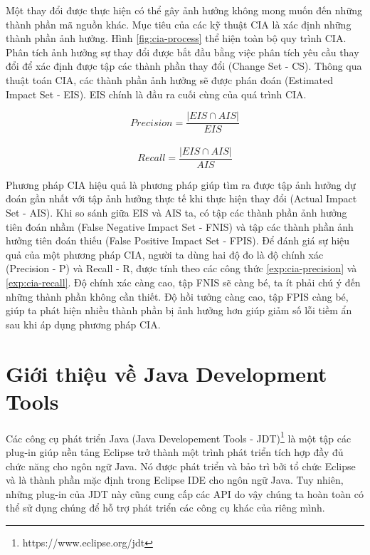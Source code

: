 \documentclass[12pt]{report}
\begin{document}
Một thay đổi được thực hiện có thể gây ảnh hưởng không mong muốn đến những thành phần mã nguồn khác. Mục tiêu của các kỹ thuật CIA là xác định những thành phần ảnh hưởng. Hình \ref{fig:cia-process} thể hiện toàn bộ quy trình CIA. Phân tích ảnh hưởng sự thay đổi được bắt đầu bằng việc phân tích yêu cầu thay đổi để xác định được tập các thành phần thay đổi (Change Set - CS). Thông qua thuật toán CIA, các thành phần ảnh hưởng sẽ được phán đoán (Estimated Impact Set - EIS). EIS chính là đầu ra cuối cùng của quá trình CIA.

\begin{equation}
Precision = \frac{|EIS \cap AIS|}{EIS}
\label{exp:cia-precision}
\end{equation}
\\
\begin{equation}
Recall = \frac{|EIS \cap AIS|}{AIS}
\label{exp:cia-recall}
\end{equation}

Phương pháp CIA hiệu quả là phương pháp giúp tìm ra được tập ảnh hưởng dự đoán gần nhất với tập ảnh hưởng thực tế khi thực hiện thay đổi (Actual Impact Set - AIS). Khi so sánh giữa EIS và AIS ta, có tập các thành phần ảnh hưởng tiên đoán nhầm (False Negative Impact Set - FNIS) và tập các thành phần ảnh hưởng tiên đoán thiếu (False Positive Impact Set - FPIS). Để đánh giá sự hiệu quả của một phương pháp CIA, người ta dùng hai độ đo là độ chính xác (Precision - P) và Recall - R, được tính theo các công thức \ref{exp:cia-precision} và \ref{exp:cia-recall}. Độ chính xác càng cao, tập FNIS sẽ càng bé, ta ít phải chú ý đến những thành phần không cần thiết. Độ hồi tưởng càng cao, tập FPIS càng bé, giúp ta phát hiện nhiều thành phần bị ảnh hưởng hơn giúp giảm số lỗi tiềm ẩn sau khi áp dụng phương pháp CIA.

\section{Giới thiệu về Java Development Tools}
Các công cụ phát triển Java (Java Developement Tools - JDT)\footnote{https://www.eclipse.org/jdt} là một tập các plug-in giúp nền tảng Eclipse trở thành một trình phát triển tích hợp đầy đủ chức năng cho ngôn ngữ Java. Nó được phát triển và bảo trì bởi tổ chức Eclipse và là thành phần mặc định trong Eclipse IDE cho ngôn ngữ Java. Tuy nhiên, những plug-in của JDT này cũng cung cấp các API do vậy chúng ta hoàn toàn có thể sử dụng chúng để hỗ trợ phát triển các công cụ khác của riêng mình.
\end{document}
